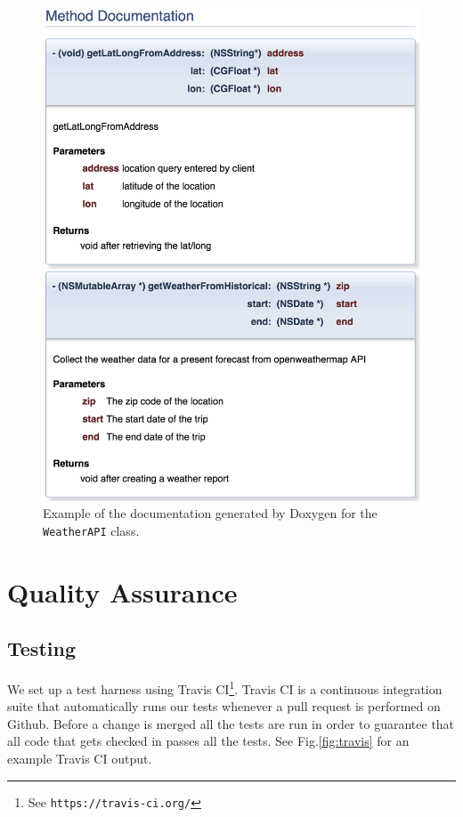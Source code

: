 \documentclass[11pt]{article}
\begin{document}
    \begin{figure}
    \centering
    \includegraphics[scale=0.5]{img/doxygen.png}
    \caption{Example of the documentation generated by Doxygen for the \texttt{WeatherAPI} class.}
    \label{fig:doc}
    \end{figure}




\section{Quality Assurance}

\subsection{Testing}
We set up a test harness using Travis CI\footnote{See \texttt{https://travis-ci.org/}}. Travis CI is a continuous integration suite that automatically runs our tests whenever a pull request is performed on Github. Before a change is merged all the tests are run in order to guarantee that all code that gets checked in passes all the tests. See Fig.\ref{fig:travis} for an example Travis CI output.
\end{document}
